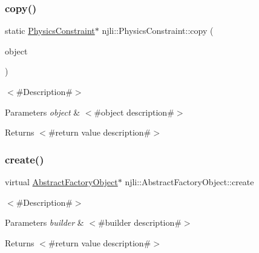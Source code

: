 \subsubsection{\texorpdfstring{copy()}{copy()}}
{\footnotesize\ttfamily static \mbox{\hyperlink{classnjli_1_1_physics_constraint}{Physics\+Constraint}}$\ast$ njli\+::\+Physics\+Constraint\+::copy (\begin{DoxyParamCaption}\item[{const \mbox{\hyperlink{classnjli_1_1_physics_constraint}{Physics\+Constraint}} \&}]{object }\end{DoxyParamCaption})\hspace{0.3cm}{\ttfamily [static]}}

$<$\#\+Description\#$>$


\begin{DoxyParams}{Parameters}
{\em object} & $<$\#object description\#$>$\\
\hline
\end{DoxyParams}
\begin{DoxyReturn}{Returns}
$<$\#return value description\#$>$ 
\end{DoxyReturn}
\mbox{\label{classnjli_1_1_physics_constraint_a83a8876ae63b92804004cf3febe76573}} 
\subsubsection{\texorpdfstring{create()}{create()}\hspace{0.1cm}{\footnotesize\ttfamily [1/3]}}
{\footnotesize\ttfamily virtual \mbox{\hyperlink{classnjli_1_1_abstract_factory_object}{Abstract\+Factory\+Object}}$\ast$ njli\+::\+Abstract\+Factory\+Object\+::create}

$<$\#\+Description\#$>$


\begin{DoxyParams}{Parameters}
{\em builder} & $<$\#builder description\#$>$\\
\hline
\end{DoxyParams}
\begin{DoxyReturn}{Returns}
$<$\#return value description\#$>$ 
\end{DoxyReturn}
\mbox{\label{classnjli_1_1_physics_constraint_a40da285e559ad3daf2ca60452a92a056}} 
